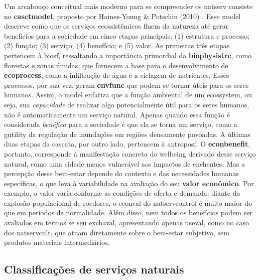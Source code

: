 \documentclass[./main.tex]{subfiles}
\begin{document}
\par Um arcabouço conceitual mais moderno para se compreender os \gls{natserv} consiste no \textbf{\gls{casctmodel}}, proposto por Haines-Young \& Potschin (2010) \cite{haines-young2010, potschin2016}. Esse \gls{model} descreve como que os serviços ecossistêmicos fluem da natureza até gerar benefícios para a sociedade em cinco etapas principais: (1) estrutura e processo; (2) função; (3) serviço; (4) benefício; e (5) valor. As primeiras três etapas pertencem à \gls{biosf}, ressaltando a importância primordial da \textbf{\gls{biophysistrc}}, como florestas e zonas úmidas, que fornecem a base para o desenvolvimento de \textbf{\gls{ecoprocess}}, como a infiltração de água e a ciclagem de nutrientes. Esses processos, por sua vez, geram \textbf{\gls{envfunc}} que podem se tornar úteis para os seres humanos. Assim, o \gls{model} enfatiza que a função ambiental de um ecos\gls{system}, ou seja, sua \textit{capacidade} de realizar algo potencialmente útil para os seres humanos, não é automaticamente um serviço natural. Apenas quando essa função é considerada \textit{benéfica} para a sociedade é que ela se torna um serviço, como a \gls{gutility} da regulação de inundações em regiões densamente povoadas. A últimas duas etapas da cascata, por outro lado, pertencem à \gls{antroposf}. O \textbf{\gls{econbenefit}}, portanto, corresponde à manifestação concreta do \gls{welbeing} derivado desse serviço natural, como uma cidade menos vulnerável aos impactos de enchentes. Mas a percepção desse bem-estar depende do contexto e das necessidades humanas específicas, o que leva à variabilidade na avaliação do seu \textbf{valor econômico}. Por exemplo, o valor varia conforme as condições de oferta e demanda: diante da explosão populacional de roedores, o \gls{econval} do \gls{natservcontrol} é muito maior do que em períodos de normalidade. Além disso, nem todos os benefícios podem ser avaliados em termos se seu \gls{exchaval}, apresentando apenas \gls{useval}, como no caso dos \gls{natservcult}, que atuam diretamente sobre o bem-estar subjetivo, sem produtos materiais intermediários.

\subsection{Classificações de serviços naturais} \label{sec:natserv:sist}
\end{document}
